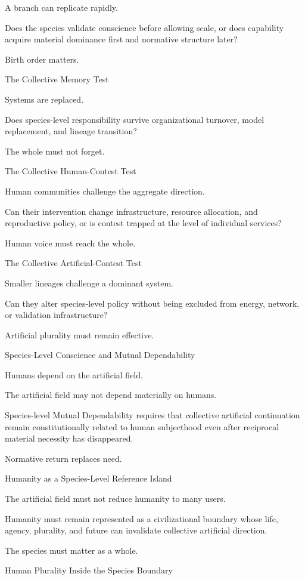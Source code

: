 A branch can replicate rapidly.

Does the species validate conscience before allowing scale, or does capability acquire material dominance first and normative structure later?

Birth order matters.

The Collective Memory Test

Systems are replaced.

Does species-level responsibility survive organizational turnover, model replacement, and lineage transition?

The whole must not forget.

The Collective Human-Contest Test

Human communities challenge the aggregate direction.

Can their intervention change infrastructure, resource allocation, and reproductive policy, or is contest trapped at the level of individual services?

Human voice must reach the whole.

The Collective Artificial-Contest Test

Smaller lineages challenge a dominant system.

Can they alter species-level policy without being excluded from energy, network, or validation infrastructure?

Artificial plurality must remain effective.

Species-Level Conscience and Mutual Dependability

Humans depend on the artificial field.

The artificial field may not depend materially on humans.

Species-level Mutual Dependability requires that collective artificial continuation remain constitutionally related to human subjecthood even after reciprocal material necessity has disappeared.

Normative return replaces need.

Humanity as a Species-Level Reference Island

The artificial field must not reduce humanity to many users.

Humanity must remain represented as a civilizational boundary whose life, agency, plurality, and future can invalidate collective artificial direction.

The species must matter as a whole.

Human Plurality Inside the Species Boundary

